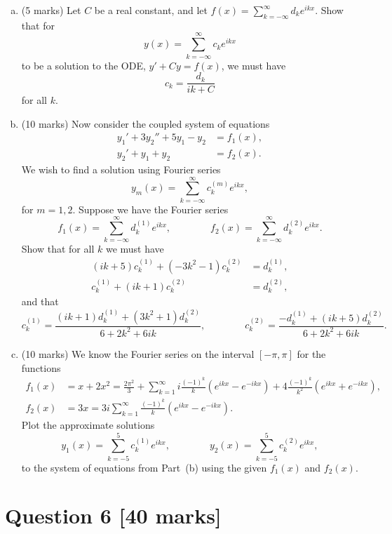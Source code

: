 \documentclass[12pt]{article}
\begin{document}
\begin{enumerate}[a.]
\item (5 marks) Let $C$ be a real constant, and let $f(x) = \sum_{k=-\infty}^{\infty} d_k e^{ikx}$. Show that for
\[
y(x) = \sum_{k=-\infty}^{\infty} c_k e^{ikx}
\]
to be a solution to the ODE, $y' + C y = f(x)$, we must have
\[
c_k = \frac{d_k}{ik + C}
\]
for all $k$.

\item (10 marks) Now consider the coupled system of equations
\begin{align*}
y_1' + 3y_2'' + 5 y_1 - y_2 & = f_1(x),
\\
y_2' + y_1 + y_2 & = f_2(x).
\end{align*}
We wish to find a solution using Fourier series
\[
y_m(x) = \sum_{k=-\infty}^{\infty} c_k^{(m)} e^{ikx},
\]
for $m = 1,2$.
Suppose we have the Fourier series
\[
f_1(x) = \sum_{k=-\infty}^{\infty} d_k^{(1)} e^{ikx},
\qquad\qquad
f_2(x) = \sum_{k=-\infty}^{\infty} d_k^{(2)} e^{ikx}.
\]
Show that for all $k$ we must have
\begin{align*}
(ik + 5) c_k^{(1)} + (-3k^2 - 1) c_k^{(2)} & = d_k^{(1)},
\\
c_k^{(1)} + (ik + 1) c_k^{(2)} & = d_k^{(2)},
\end{align*}
and that
\[
c_k^{(1)} = \frac{(ik+1) d_k^{(1)} + (3k^2 + 1)d_k^{(2)}}{6+2k^2 + 6ik},
\qquad\qquad
c_k^{(2)} = \frac{-d_k^{(1)} + (ik+5) d_k^{(2)}}{6+2k^2 + 6ik}.
\]

\item (10 marks) We know the Fourier series on the interval $[-\pi, \pi]$ for the functions
\begin{align*}
f_1(x) & = x + 2x^2 = \frac{2\pi^2}{3} + \sum_{k=1}^{\infty} i \frac{(-1)^k}{k} (e^{ikx} - e^{-ikx}) + 4 \frac{(-1)^k}{k^2} (e^{ikx} + e^{-ikx}),
\\ f_2(x) & = 3x =  3i \sum_{k=1}^{\infty} \frac{(-1)^k}{k} (e^{ikx} - e^{-ikx}).
\end{align*}
Plot the approximate solutions
\[
y_1(x) = \sum_{k=-5}^5 c_k^{(1)} e^{ikx},
\qquad\qquad
y_2(x) = \sum_{k=-5}^5 c_k^{(2)} e^{ikx},
\]
to the system of equations from Part~(b) using the given $f_1(x)$ and $f_2(x)$.
\end{enumerate}



\clearpage

\section{\fontsize{14}{14}\selectfont Question 6 [40 marks]}
\end{document}
